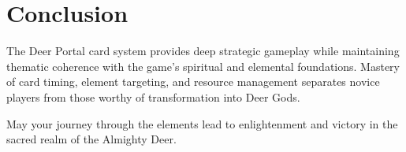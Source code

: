 \documentclass[12pt,a4paper]{article}
\begin{document}
\section{Conclusion}

The Deer Portal card system provides deep strategic gameplay while maintaining thematic coherence with the game's spiritual and elemental foundations. Mastery of card timing, element targeting, and resource management separates novice players from those worthy of transformation into Deer Gods.

May your journey through the elements lead to enlightenment and victory in the sacred realm of the Almighty Deer.
\end{document}
